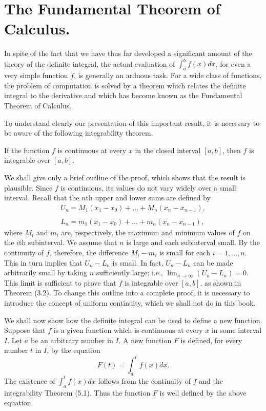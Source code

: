 \section{The Fundamental Theorem of Calculus.} 
In spite of the fact that we have thus far developed a
significant amount of the theory of the definite integral, the actual evaluation of $ \int_{a}^{b} f(x) dx$, for even a very simple function $f$, is generally an arduous task. For a wide class of functions, the problem of computation is solved by a theorem which relates the definite integral to the derivative and which has become known as the Fundamental Theorem of Calculus.

To understand clearly our presentation of this important result, it is necessary to be aware of the following integrability theorem.

\begin{theorem} %
If the function $f$ is continuous at every $x$ in the closed interval $[a, b]$, then $f$ is integrable over $[a, b]$.
\end{theorem}

We shall give only a brief outline of the proof, which shows that the result is plausible. Since $f$ is continuous, its values do not vary widely over a small interval. Recall that the $n$th upper and lower sums are defined by
$$
\begin{array}{l}
U_n = M_{1}(x_{1} - x_0) + ... + M_{n}(x_{n} - x_{n-1}), \\
\\
L_n = m_{1}(x_{1} - x_0) + ... + m_{n}(x_{n} -  x_{n-1}),
\end{array}
$$
\noindent where $M_i$ and $m_i$ are, respectively, the maximum and minimum values of $f$ on the $i$th subinterval. We assume that $n$ is large and each subinterval small. By the continuity of $f$, therefore, the difference $M_{i} - m_{i}$ is small for each $i = 1, . . ., n$. This in turn implies that
$U_{n} - L_{n}$ is small. In fact, $U_{n} - L_{n}$ can be made arbitrarily small by taking $n$ sufficiently large; i.e., $\lim_{n \rightarrow \infty} (U_{n} - L_{n}) = 0$. This limit is sufficient to prove that $f$ is integrable over $[a, b]$, as shown in Theorem (3.2). To change this outline into a complete proof, it is necessary to introduce the concept of uniform continuity, which we shall not do in this book.

We shall now show how the definite integral can be used to define a new function. Suppose that $f$ is a given function which is continuous at every $x$ in some interval $I$. Let $a$ be an arbitrary number in $I$. A new function $F$ is defined, for every number $t$ in $I$, by the equation
$$
F(t) = \int_{a}^{t} f(x) dx. 
$$
\noindent The existence of $\int_{a}^{t} f(x) dx$ follows from the continuity of $f$ and the integrability Theorem (5.1).  Thus the function $F$ is well defined by the above equation.

